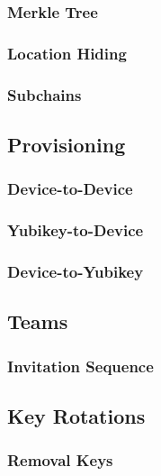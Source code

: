 \subsubsection{Merkle Tree}
\label{sec:merkle}

\subsubsection{Location Hiding}
\label{sec:location-hiding}

\subsubsection{Subchains}
\label{sec:subchains}


\subsection{Provisioning}

\subsubsection{Device-to-Device}

\subsubsection{Yubikey-to-Device}

\subsubsection{Device-to-Yubikey}

\subsection{Teams}
\label{sec:teams}

\subsubsection{Invitation Sequence}

\subsection{Key Rotations}

\subsubsection{Removal Keys}

